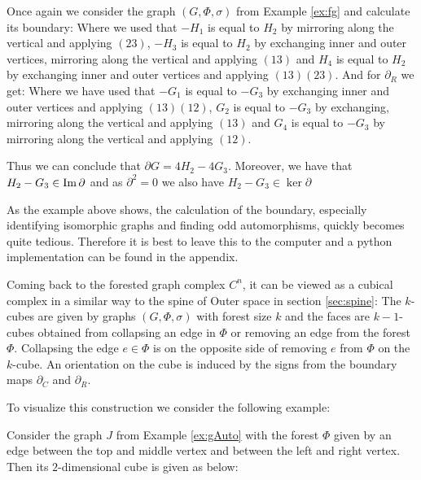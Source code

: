 \begin{eg}
	Once again we consider the graph $(G,\Phi,\sigma)$ from Example \ref{ex:fg} and calculate its boundary:
	Where we used that $-H_{1}$ is equal to $H_{2}$ by mirroring along the vertical and applying $(2 3)$,
	$-H_{3}$ is equal to $H_2$ by exchanging inner and outer vertices, mirroring along the vertical and applying $(1 3)$ and
	$H_{4}$ is equal to $H_{2}$ by exchanging inner and outer vertices and applying $(1 3)(2 3)$.
	And for $\partial_R$ we get:
	Where we have used that $-G_{1}$ is equal to $-G_{3}$ by exchanging inner and outer vertices and applying $(1 3)(1 2)$,
	$G_{2}$ is equal to $-G_{3}$ by exchanging, mirroring along the vertical and applying $(1 3)$ and
	$G_{4}$ is equal to $-G_{3}$ by mirroring along the vertical and applying $(1 2)$. 

	Thus we can conclude that $\partial G = 4 H_2 - 4 G_3$. Moreover, we have that $H_2 - G_3 \in \operatorname{Im} \partial$ and 
	as $\partial^2=0$ we also have $H_2 - G_3 \in \ker \partial$
\end{eg}

\begin{remark}
As the example above shows, the calculation of the boundary, especially identifying isomorphic graphs and finding odd automorphisms, 
quickly becomes quite tedious. Therefore it is best to leave this to the computer and a python implementation can be found in the appendix.
\end{remark}

Coming back to the forested graph complex $C^{n}$, it can be viewed as a cubical complex in a similar way to the spine of Outer space in section \ref{sec:spine}:
The $k$-cubes are given by graphs $(G,\Phi,\sigma)$
with forest size $k$ and the faces are $k-1$-cubes obtained from collapsing an edge in $\Phi$ 
or removing an edge from the forest $\Phi$. Collapsing the edge $e \in \Phi$ is
on the opposite side of removing $e$ from $\Phi$ on the $k$-cube.
An orientation on the cube is induced by the signs from the boundary maps $\partial_{C}$ and $\partial_{R}$.

To visualize this construction we consider the following example:
\begin{eg}
	Consider the graph $J$ from Example \ref{ex:gAuto} with the forest $\Phi$ given by an edge between the top and middle vertex and
	between the left and right vertex.
	Then its $2$-dimensional cube is given as below:
\end{eg}
\newpage
